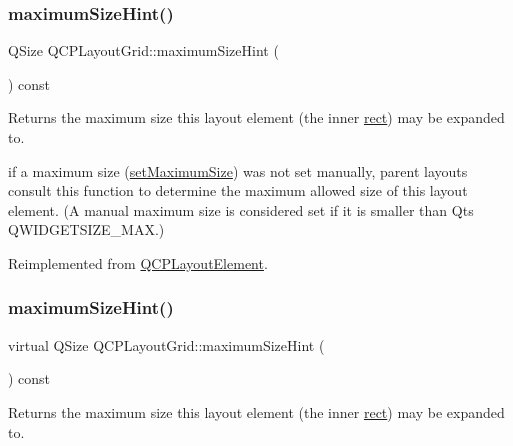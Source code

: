 \subsubsection{\texorpdfstring{maximum\+Size\+Hint()}{maximumSizeHint()}\hspace{0.1cm}{\footnotesize\ttfamily [1/2]}}
{\footnotesize\ttfamily Q\+Size Q\+C\+P\+Layout\+Grid\+::maximum\+Size\+Hint (\begin{DoxyParamCaption}{ }\end{DoxyParamCaption}) const\hspace{0.3cm}{\ttfamily [virtual]}}

Returns the maximum size this layout element (the inner \hyperlink{class_q_c_p_layout_element_a208effccfe2cca4a0eaf9393e60f2dd4}{rect}) may be expanded to.

if a maximum size (\hyperlink{class_q_c_p_layout_element_a74eb5280a737ab44833d506db65efd95}{set\+Maximum\+Size}) was not set manually, parent layouts consult this function to determine the maximum allowed size of this layout element. (A manual maximum size is considered set if it is smaller than Qt\textquotesingle{}s Q\+W\+I\+D\+G\+E\+T\+S\+I\+Z\+E\+\_\+\+M\+AX.) 

Reimplemented from \hyperlink{class_q_c_p_layout_element_ab5ce2ba22b36d9a3b70a1be562c326e5}{Q\+C\+P\+Layout\+Element}.

\mbox{\label{class_q_c_p_layout_grid_a22505c47e97c26621116072994e70cf3}} 
\subsubsection{\texorpdfstring{maximum\+Size\+Hint()}{maximumSizeHint()}\hspace{0.1cm}{\footnotesize\ttfamily [2/2]}}
{\footnotesize\ttfamily virtual Q\+Size Q\+C\+P\+Layout\+Grid\+::maximum\+Size\+Hint (\begin{DoxyParamCaption}{ }\end{DoxyParamCaption}) const\hspace{0.3cm}{\ttfamily [virtual]}}

Returns the maximum size this layout element (the inner \hyperlink{class_q_c_p_layout_element_a208effccfe2cca4a0eaf9393e60f2dd4}{rect}) may be expanded to.

